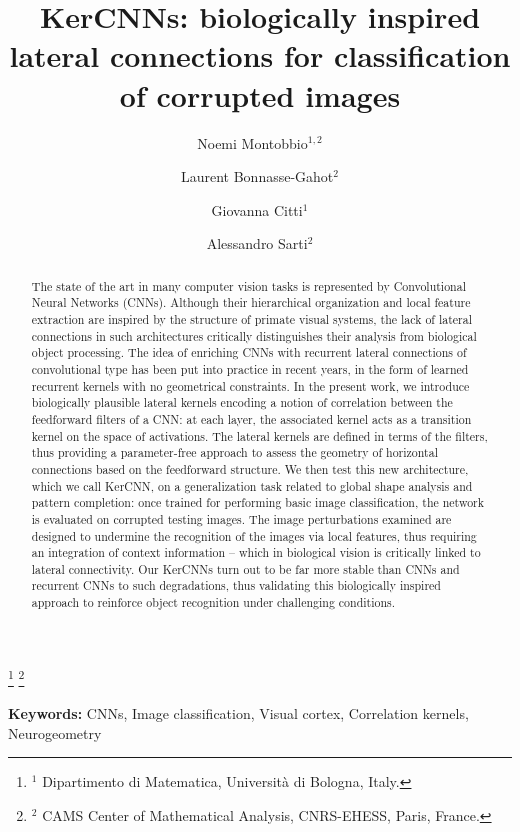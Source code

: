 \documentclass[11pt,oneside,reqno]{amsart}
\begin{document}
 \title[KerCNNs]{KerCNNs: biologically inspired lateral connections for classification of corrupted images}
 \author[N. Montobbio]{Noemi Montobbio$^{1,2}$}
 \thanks{$^1$ Dipartimento di Matematica, Universit\`{a} di Bologna, Italy.} \thanks{$^2$ CAMS Center of Mathematical Analysis, CNRS-EHESS, Paris, France.}
 \author[L. Bonnasse-Gahot]{Laurent Bonnasse-Gahot$^2$}
 \author[G. Citti]{Giovanna Citti$^1$}
 \author[A. Sarti]{Alessandro Sarti$^2$}
 \date{}
 \maketitle
 
 {\bf Keywords:} CNNs, Image classification, Visual cortex, Correlation kernels, Neurogeometry
 
 \begin{abstract}
  The state of the art in many computer vision tasks is represented by Convolutional Neural Networks (CNNs). Although their hierarchical organization and local feature extraction are inspired by the structure of primate visual systems, the lack of lateral connections in such architectures critically distinguishes their analysis from biological object processing. The idea of enriching CNNs with recurrent lateral connections of convolutional type has been put into practice in recent years, in the form of learned recurrent kernels with no geometrical constraints. In the present work, we introduce biologically plausible lateral kernels encoding a notion of correlation between the feedforward filters of a CNN: at each layer, the associated kernel acts as a transition kernel on the space of activations. The lateral kernels are defined in terms of the filters, thus providing a parameter-free approach to assess the geometry of horizontal connections based on the feedforward structure. We then test this new architecture, which we call KerCNN, on a generalization task related to global shape analysis and pattern completion: once trained for performing basic image classification, the network is evaluated on corrupted testing images. The image perturbations examined are designed to undermine the recognition of the images via local features, thus requiring an integration of context information -- which in biological vision is critically linked to lateral connectivity. Our KerCNNs turn out to be far more stable than CNNs and recurrent CNNs to such degradations, thus validating this biologically inspired approach to reinforce object recognition under challenging conditions.
 \end{abstract}
\end{document}
